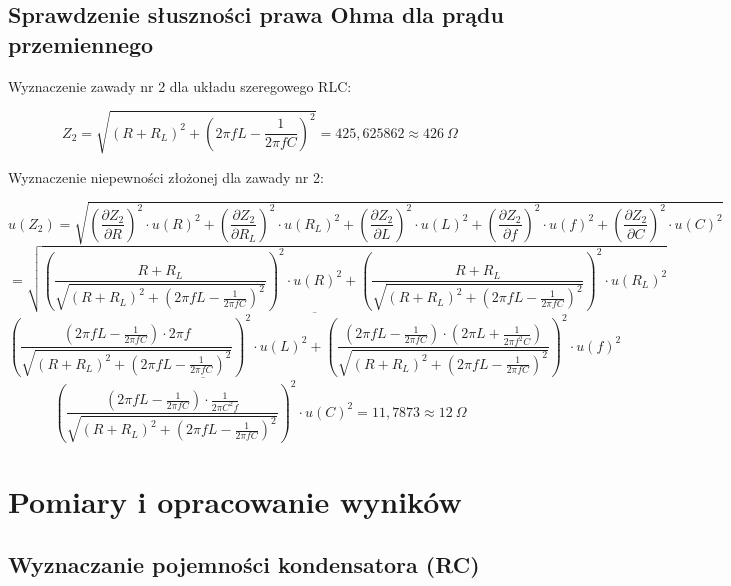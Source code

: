 \documentclass[12pt]{article}
\newcommand{\dpartial}[2]{\frac{\partial #1}{\partial #2}}
\newcommand{\physdpartial}[2]{\left( \dpartial{#1}{#2} \right)^2}
\newcommand{\powfrac}[2]{\left( \frac{#1}{#2} \right)^2}
\begin{document}
\pagebreak

\subsection{Sprawdzenie słuszności prawa Ohma dla prądu przemiennego}

Wyznaczenie zawady nr 2 dla układu szeregowego RLC:

\[ Z_2 = \sqrt{(R + R_L)^2 + \left(2 \pi f L - \frac{1}{2 \pi f C}\right)^2} = 425,625862 \approx 426 \ \Omega \]

Wyznaczenie niepewności złożonej dla zawady nr 2:

\[ u(Z_2) = \sqrt{ \physdpartial{Z_2}{R} \cdot u(R)^2 + \physdpartial{Z_2}{R_L} \cdot u(R_L)^2 + \physdpartial{Z_2}{L} \cdot u(L)^2 + \physdpartial{Z_2}{f} \cdot u(f)^2 + \physdpartial{Z_2}{C} \cdot u(C)^2 } \]
\[ = \sqrt{ \powfrac{R + R_L}{\sqrt{(R + R_L)^2 + \left(2 \pi f L - \frac{1}{2\pi f C}\right)^2}} \cdot u(R)^2 + \powfrac{R+R_L}{\sqrt{(R + R_L)^2 + \left(2 \pi f L - \frac{1}{2\pi f C}\right)^2}} \cdot u(R_L)^2 } \]
\[ \overline{ \powfrac{\left( 2\pi f L - \frac{1}{2 \pi f C} \right) \cdot 2 \pi f}{\sqrt{(R + R_L)^2 + \left(2 \pi f L - \frac{1}{2\pi f C}\right)^2}} \cdot u(L)^2 + 
\powfrac{\left(2 \pi f L - \frac{1}{2 \pi f C}\right) \cdot \left( 2\pi L + \frac{1}{2 \pi f^2 C} \right)}{\sqrt{(R + R_L)^2 + \left(2 \pi f L - \frac{1}{2\pi f C}\right)^2}} \cdot u(f)^2} \]
\[ \overline{ \powfrac{\left( 2 \pi f L - \frac{1}{2 \pi f C} \right) \cdot \frac{1}{2 \pi C^2 f}}{\sqrt{(R + R_L)^2 + \left(2 \pi f L - \frac{1}{2\pi f C}\right)^2}} \cdot u(C)^2 } 
= 11,7873 \approx 12 \ \Omega \]

\pagebreak

\section{Pomiary i opracowanie wyników}

\subsection{Wyznaczanie pojemności kondensatora (RC)}
\end{document}
